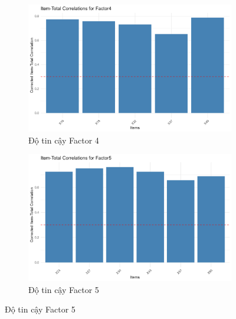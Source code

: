 \begin{figure}[h!]
    \vskip 0.5cm
    \begin{subfigure}[b]{0.45\linewidth}
        \centering
        \includegraphics[width=\linewidth]{../../assets/images/reliability_Factor4.png}
        \caption{Độ tin cậy Factor 4}
        \label{fig:reliability_f4}
    \end{subfigure}
    \hfill
    \begin{subfigure}[b]{0.45\linewidth}
        \centering
        \includegraphics[width=\linewidth]{../../assets/images/reliability_Factor5.png}
        \caption{Độ tin cậy Factor 5}
        \label{fig:reliability_f5}
    \end{subfigure}


\end{figure}
